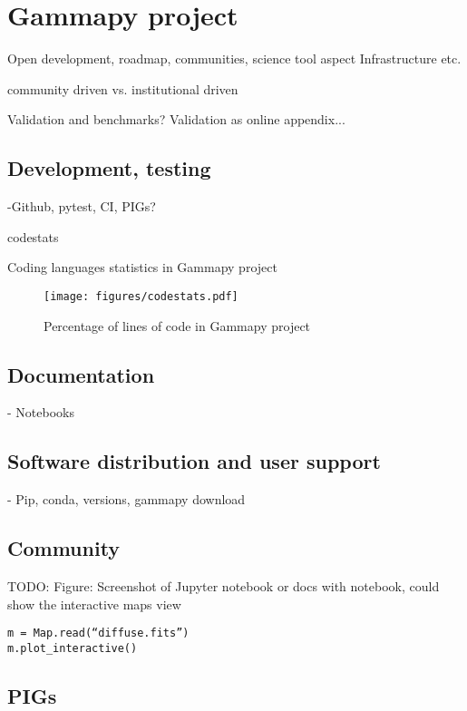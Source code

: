 \section{Gammapy project}
\label{sec:gammapy-project}

Open development, roadmap, communities, science tool aspect Infrastructure etc.

community driven vs. institutional driven

Validation and benchmarks? Validation as online appendix...

\subsection{Development, testing}
\label{ssec:development-testing}
-Github, pytest, CI, PIGs?

\begin{table}
	{codestats}
	\caption{Coding languages statistics in Gammapy project}
	\label{table:codestats:data}
\end{table}

\begin{figure}[t]
	\centering
	\texttt{[image: figures/codestats.pdf]}
	\caption{
		Percentage of lines of code in Gammapy project
	}
	\label{fig:codestats:lang}
\end{figure}

\subsection{Documentation}
\label{ssec:documentation}

- Notebooks

\subsection{Software distribution and user support}
\label{ssec:software-distribution-and-user-support}
- Pip, conda, versions, gammapy download

\subsection{Community}
\label{ssec:community}
TODO: Figure: Screenshot of Jupyter notebook or docs with notebook, could show
the interactive maps view
\begin{verbatim}
m = Map.read(“diffuse.fits”)
m.plot_interactive()
\end{verbatim}

\subsection{PIGs}
\label{ssec:pigs}
